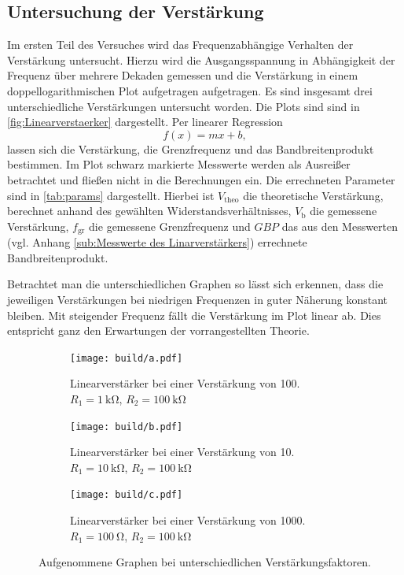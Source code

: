 \subsection{Untersuchung der Verstärkung}
Im ersten Teil des Versuches wird das Frequenzabhängige Verhalten der Verstärkung untersucht.
Hierzu wird die Ausgangsspannung in Abhängigkeit der Frequenz über mehrere Dekaden gemessen 
und die Verstärkung in einem doppellogarithmischen Plot aufgetragen aufgetragen.
Es sind insgesamt drei unterschiedliche Verstärkungen untersucht worden.
Die Plots sind sind in \autoref{fig:Linearverstaerker} dargestellt.
Per linearer Regression
\begin{equation*}
    f(x) = mx+b,
\end{equation*}
lassen sich die Verstärkung, die Grenzfrequenz und das Bandbreitenprodukt bestimmen.
Im Plot schwarz markierte Messwerte werden als Ausreißer betrachtet 
und fließen nicht in die Berechnungen ein.
Die errechneten Parameter sind in \autoref{tab:params} dargestellt.
Hierbei ist $V_\text{theo}$ die theoretische Verstärkung, berechnet anhand des gewählten 
Widerstandsverhältnisses, $V_\text{b}$ die gemessene Verstärkung, $f_\text{gr}$ die 
gemessene Grenzfrequenz und $GBP$ das aus den Messwerten 
(vgl. Anhang \ref{sub:Messwerte des Linarverstärkers}) errechnete Bandbreitenprodukt.

\FloatBarrier
Betrachtet man die unterschiedlichen Graphen so lässt sich erkennen, dass
die jeweiligen Verstärkungen bei niedrigen Frequenzen in guter Näherung konstant
bleiben. Mit steigender Frequenz fällt die Verstärkung im Plot linear ab.
Dies entspricht ganz den Erwartungen der vorrangestellten Theorie.
\begin{figure}
    \centering
    \begin{subfigure}[b]{0.45\textwidth}
        \centering
        \texttt{[image: build/a.pdf]}
        \caption{Linearverstärker bei einer Verstärkung von 100. $R_1 = \SI{1}{\kilo\ohm}$,
        $R_2 = \SI{100}{\kilo\ohm}$ }
        \label{fig:a}
    \end{subfigure}
    \hfill
    \begin{subfigure}[b]{0.45\textwidth}
        \centering
        \texttt{[image: build/b.pdf]}
        \caption{Linearverstärker bei einer Verstärkung von 10. $R_1 = \SI{10}{\kilo\ohm}$,
        $R_2 = \SI{100}{\kilo\ohm}$ }
        \label{fig:b}
    \end{subfigure}
    \newline
    \newline    
    \newline    
    \newline    
    \begin{subfigure}[b]{0.45\textwidth}
        \centering
        \texttt{[image: build/c.pdf]}
        \caption{Linearverstärker bei einer Verstärkung von 1000. $R_1 = \SI{100}{\ohm}$,
        $R_2 = \SI{100}{\kilo\ohm}$ }
        \label{fig:c}
    \end{subfigure}
       \caption{Aufgenommene Graphen bei unterschiedlichen Verstärkungsfaktoren.}
       \label{fig:Linearverstaerker}
\end{figure}
\FloatBarrier

